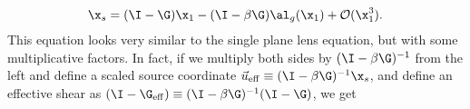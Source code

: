\begin{equation}
\x_s = (\I - \G) \x_1  - (\I - \beta \G)\al_g(\x_1) + \mathcal{O}(\x_1^3).
\label{eq:background}
\end{equation}
This equation looks very similar to the single plane lens equation, but with some multiplicative factors. In fact, if we multiply both sides by $(\I - \beta \G)^{-1}$ from the left and define a scaled source coordinate $\vec{u}_{\rm eff} \equiv (\I - \beta \G)^{-1} \x_s$, and define an effective shear as $(\I -\G_{\rm eff}) \equiv (\I - \beta\G)^{-1} (\I - \G)$, we get
  